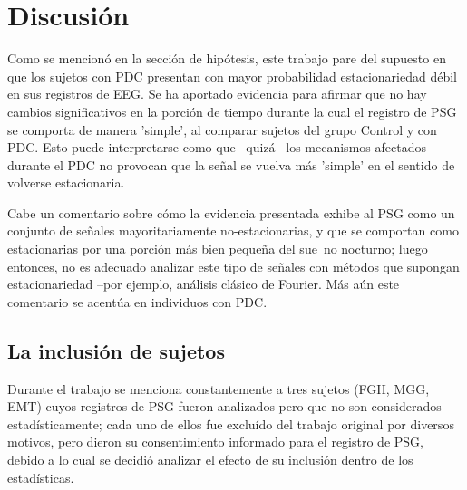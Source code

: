 \documentclass[12pt,a4paper]{mitthesis}
\begin{document}

\section{Discusi\'on}

Como se mencion\'o en la secci\'on de hip\'otesis, este trabajo pare del supuesto en que los
sujetos con PDC presentan con mayor probabilidad estacionariedad d\'ebil en sus registros de EEG.
Se ha aportado evidencia para afirmar que no hay cambios significativos en la porci\'on de tiempo 
durante la cual el registro de PSG se comporta de manera 'simple', al comparar sujetos del grupo Control y con
PDC. Esto puede interpretarse como que --quiz\'a-- los mecanismos afectados durante el PDC no 
provocan que la se\~nal se vuelva m\'as 'simple' en el sentido de volverse estacionaria.

Cabe un comentario sobre c\'omo la evidencia presentada exhibe al PSG como un conjunto de se\~nales 
mayoritariamente no-estacionarias, y que se comportan como estacionarias por una porci\'on m\'as
bien peque\~na del sue~no nocturno; luego entonces, no es adecuado analizar este tipo de se\~nales 
con m\'etodos que supongan estacionariedad --por ejemplo, an\'alisis cl\'asico de Fourier. 
M\'as a\'un este comentario se acent\'ua en individuos con PDC.


\subsection{La inclusi\'on de sujetos}

Durante el trabajo se menciona constantemente a tres sujetos (FGH, MGG, EMT) cuyos registros de PSG 
fueron analizados pero que no son considerados estad\'isticamente; cada uno de ellos fue exclu\'ido 
del trabajo original \cite{VazquezTagle16} por diversos motivos, pero dieron su consentimiento 
informado para el registro de PSG, debido a lo cual se decidi\'o analizar el efecto de su 
inclusi\'on dentro de los estad\'isticas.
\end{document}

